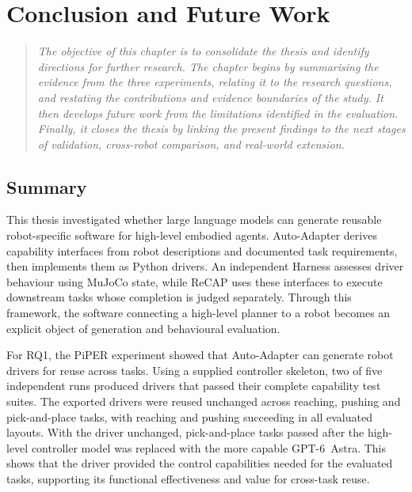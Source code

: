 \chapter[Conclusion and Future Work]{Conclusion and Future Work}\label{chapter:runtime-improvement}\label{chapter:discussion}\label{chapter:conclusion}

\begin{quote}\itshape
The objective of this chapter is to consolidate the thesis and identify
directions for further research. The chapter begins by summarising the evidence
from the three experiments, relating it to the research questions, and
restating the contributions and evidence boundaries of the study. It then
develops future work from the limitations identified in the evaluation.
Finally, it closes the thesis by linking the present findings to the next
stages of validation, cross-robot comparison, and real-world extension.
\end{quote}

\section[Summary]{Summary}

This thesis investigated whether large language models can generate reusable
robot-specific software for high-level embodied agents. Auto-Adapter derives
capability interfaces from robot descriptions and documented task requirements,
then implements them as Python drivers. An independent Harness assesses driver
behaviour using MuJoCo state, while \mbox{ReCAP} uses these interfaces to execute
downstream tasks whose completion is judged separately. Through this framework,
the software connecting a high-level planner to a robot becomes an explicit
object of generation and behavioural evaluation.

For RQ1, the PiPER experiment showed that Auto-Adapter can generate robot
drivers for reuse across tasks. Using a supplied controller skeleton, two of
five independent runs produced drivers that passed their complete capability
test suites. The exported drivers were reused unchanged across reaching,
pushing and pick-and-place tasks, with reaching and pushing succeeding in all
evaluated layouts. With the driver unchanged, pick-and-place tasks passed
after the high-level controller model was replaced with the more capable
\mbox{GPT-6 Astra}. This shows that the driver provided the control capabilities needed
for the evaluated tasks, supporting its functional effectiveness and value for
cross-task reuse.

